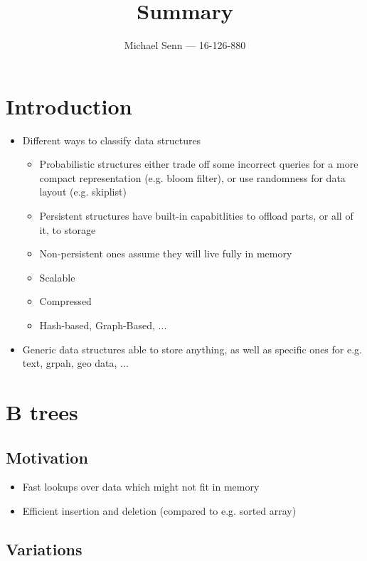 \documentclass[a4paper]{scrreprt}
\title{Summary}
\author{Michael Senn \maillink{michael.senn@students.unibe.ch} --- 16-126-880}
\date{\printdate}
\begin{document}
\maketitle

\chapter{Introduction}

\begin{itemize}
		\item Different ways to classify data structures
				\begin{itemize}
						\item Probabilistic structures either trade off some
								incorrect queries for a more compact
								representation (e.g. bloom filter), or use
								randomness for data layout (e.g. skiplist)
						\item Persistent structures have built-in capabitlities
								to offload parts, or all of it, to storage
						\item Non-persistent ones assume they will live fully
								in memory
						\item Scalable
						\item Compressed
						\item Hash-based, Graph-Based, ...
				\end{itemize}
		\item Generic data structures able to store anything, as well as
				specific ones for e.g. text, grpah, geo data, ...
\end{itemize}

\chapter{B trees}

\section{Motivation}

\begin{itemize}
		\item Fast lookups over data which might not fit in memory
		\item Efficient insertion and deletion (compared to e.g. sorted array)
\end{itemize}

\section{Variations}
\end{document}
